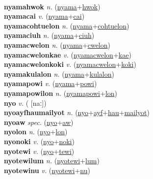  \label{nyamamat} \\
\textbf{nyamahwok} \textit{n.} (\hyperref[nyama]{nyama}+\hyperref[hwok]{hwok})
 \label{nyamahwok} \\
\textbf{nyamacai} \textit{v.} (\hyperref[nyama]{nyama}+\hyperref[cai]{cai})
 \label{nyamacai} \\
\textbf{nyamacohtuelon} \textit{n.} (\hyperref[nyama]{nyama}+\hyperref[cohtuelon]{cohtuelon})
 \label{nyamacohtuelon} \\
\textbf{nyamaciuh} \textit{n.} (\hyperref[nyama]{nyama}+\hyperref[ciuh]{ciuh})
 \label{nyamaciuh} \\
\textbf{nyamacwelon} \textit{n.} (\hyperref[nyama]{nyama}+\hyperref[cwelon]{cwelon})
 \label{nyamacwelon} \\
\textbf{nyamacwelonkae} \textit{v.} (\hyperref[nyamacwelon]{nyamacwelon}+\hyperref[kae]{kae})
 \label{nyamacwelonkae} \\
\textbf{nyamacwelonkoki} \textit{v.} (\hyperref[nyamacwelon]{nyamacwelon}+\hyperref[koki]{koki})
 \label{nyamacwelonkoki} \\
\textbf{nyamakulalon} \textit{n.} (\hyperref[nyama]{nyama}+\hyperref[kulalon]{kulalon})
 \label{nyamakulalon} \\
\textbf{nyamapowi} \textit{v.} (\hyperref[nyama]{nyama}+\hyperref[powi]{powi})
 \label{nyamapowi} \\
\textbf{nyamapowilon} \textit{n.} (\hyperref[nyamapowi]{nyamapowi}+\hyperref[lon]{lon})
 \label{nyamapowilon} \\
\textbf{nyo} \textit{v.} ( [naː])
 \label{nyo} \\
\textbf{nyoayfhaumailyot} \textit{n.} (\hyperref[nyo]{nyo}+\hyperref[ayf]{ayf}+\hyperref[hau]{hau}+\hyperref[mailyot]{mailyot})
 \label{nyoayfhaumailyot} \\
\textbf{nyoaw} \textit{spec.} (\hyperref[nyo]{nyo}+\hyperref[aw]{aw})
 \label{nyoaw} \\
\textbf{nyolon} \textit{n.} (\hyperref[nyo]{nyo}+\hyperref[lon]{lon})
 \label{nyolon} \\
\textbf{nyonoki} \textit{v.} (\hyperref[nyo]{nyo}+\hyperref[noki]{noki})
 \label{nyonoki} \\
\textbf{nyotewi} \textit{v.} (\hyperref[nyo]{nyo}+\hyperref[tewi]{tewi})
 \label{nyotewi} \\
\textbf{nyotewilum} \textit{n.} (\hyperref[nyotewi]{nyotewi}+\hyperref[lum]{lum})
 \label{nyotewilum} \\
\textbf{nyotewinu} \textit{v.} (\hyperref[nyotewi]{nyotewi}+\hyperref[nu]{nu})
